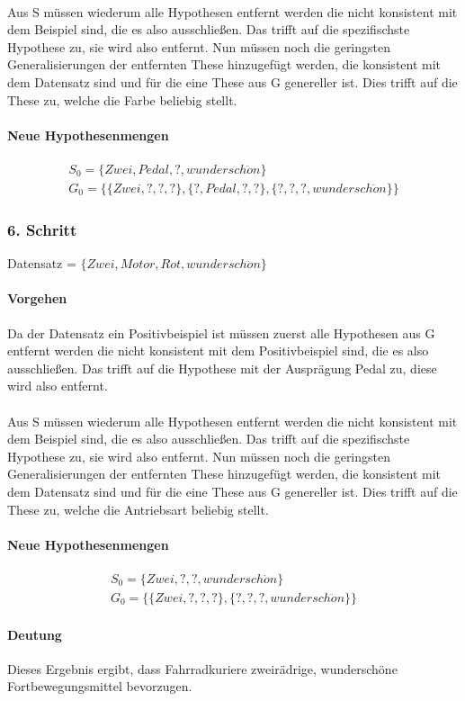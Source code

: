 \documentclass[a4paper]{article}
\begin{document}
\paragraph{}
Aus S müssen wiederum alle Hypothesen entfernt werden die nicht konsistent mit dem Beispiel sind, die es also ausschließen. Das trifft auf die spezifischste Hypothese zu, sie wird also entfernt. Nun müssen noch die geringsten Generalisierungen der entfernten These hinzugefügt werden, die konsistent mit dem Datensatz sind und für die eine These aus G genereller ist. Dies trifft auf die These zu, welche die Farbe beliebig stellt.
\paragraph{Neue Hypothesenmengen}
\begin{align*}
	S_0 = \{Zwei,Pedal,?,wundersch\ddot{o}n\} \\
	G_0 = \{ \{Zwei,?,?,?\},\{?,Pedal,?,?\}, \{?,?,?,wundersch\ddot{o}n\} \}
\end{align*}

\subsubsection{6. Schritt}
Datensatz = $ \{Zwei, Motor, Rot, wundersch\ddot{o}n\} $
\paragraph{Vorgehen}
Da der Datensatz ein Positivbeispiel ist müssen zuerst alle Hypothesen aus G entfernt werden die nicht konsistent mit dem Positivbeispiel sind, die es also ausschließen. Das trifft auf die Hypothese mit der Ausprägung Pedal zu, diese wird also entfernt. 
\paragraph{}
Aus S müssen wiederum alle Hypothesen entfernt werden die nicht konsistent mit dem Beispiel sind, die es also ausschließen. Das trifft auf die spezifischste Hypothese zu, sie wird also entfernt. Nun müssen noch die geringsten Generalisierungen der entfernten These hinzugefügt werden, die konsistent mit dem Datensatz sind und für die eine These aus G genereller ist. Dies trifft auf die These zu, welche die Antriebsart beliebig stellt.
\paragraph{Neue Hypothesenmengen}
\begin{align*}
	S_0 = \{Zwei,?,?,wundersch\ddot{o}n\} \\
	G_0 = \{ \{Zwei,?,?,?\}, \{?,?,?,wundersch\ddot{o}n\} \}
\end{align*}
\paragraph{Deutung}
Dieses Ergebnis ergibt, dass Fahrradkuriere zweirädrige, wunderschöne Fortbewegungsmittel bevorzugen.
\end{document}

